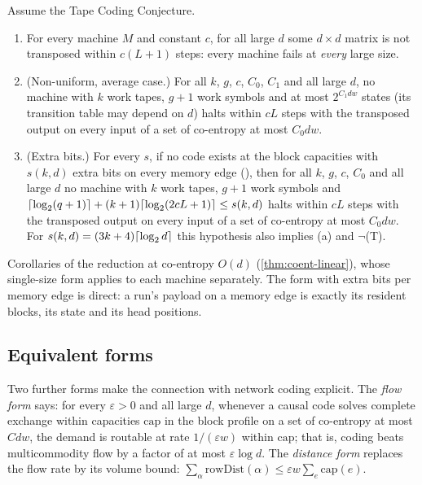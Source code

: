 \begin{theorem}\label{thm:tcc-consequences}
Assume the Tape Coding Conjecture.
\begin{enumerate}[label=(\alph*)]
\item For every machine $M$ and constant $c$, for all large $d$ some $d\times d$ matrix is not
transposed within $c(L+1)$ steps: every machine fails at \emph{every} large size.
\item (Non-uniform, average case.) For all $k$, $g$, $c$, $C_0$, $C_1$ and all large $d$, no machine
with $k$ work tapes, $g+1$ work symbols and at most $2^{C_1dw}$ states (its transition table may
depend on $d$) halts within $cL$ steps with the transposed output on every input of a set of
co-entropy at most $C_0dw$.
\item (Extra bits.) For every $s$, if no code exists at the block capacities with $s(k,d)$ extra bits on
every memory edge (), then for all $k$, $g$, $c$, $C_0$ and all large $d$ no
machine with $k$ work tapes, $g+1$ work symbols and $\lceil \log_2 (q+1) \rceil+(k+1)\lceil \log_2 (2cL+1) \rceil\le s(k,d)$ halts
within $cL$ steps with the transposed output on every input of a set of co-entropy at most $C_0dw$.
For $s(k,d)=(3k+4)\lceil \log_2 d \rceil$ this hypothesis also implies (a) and $\neg$(T).
\end{enumerate}
\end{theorem}

\begin{outline}
Corollaries of the reduction at co-entropy $O(d)$ (\cref{thm:coent-linear}), whose single-size form
applies to each machine separately. The form with extra bits per memory edge is direct: a run's
payload on a memory edge is exactly its resident blocks, its state and its head positions.
\end{outline}

\subsection{Equivalent forms}

Two further forms make the connection with network coding explicit. The \emph{flow form}
 says: for every $\varepsilon>0$ and all large $d$, whenever a causal code solves
complete exchange within capacities $\mathrm{cap}$ in the block profile on a set of co-entropy at most
$Cdw$, the demand is routable at rate $1/(\varepsilon w)$ within $\mathrm{cap}$; that is, coding beats
multicommodity flow by a factor of at most $\varepsilon\log d$. The \emph{distance form}
 replaces the flow rate by its volume bound:
$\sum_\alpha\mathrm{rowDist}(\alpha)\le\varepsilon w\sum_e\mathrm{cap}(e)$.

